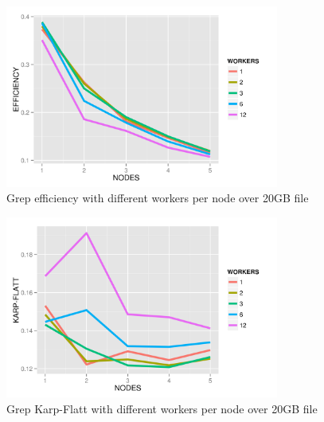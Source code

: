\documentclass{article}
\begin{document}

    \begin{figure}[H]
        \centering
        \includegraphics[width=90mm]{images/workerPerNodeEfficiency.png}
        \caption{Grep efficiency with different workers per node over 20GB file}
        \label{fig:workNodeEff}
    \end{figure}



    \begin{figure}[H]
        \centering
        \includegraphics[width=90mm]{images/workerPerNodeKarpFlatt.png}
        \caption{Grep Karp-Flatt with different workers per node over 20GB file}
        \label{fig:workNodeKF}
    \end{figure}
\end{document}
